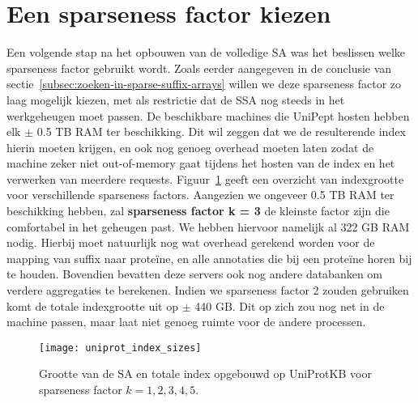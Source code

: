 \section{Een sparseness factor kiezen}
Een volgende stap na het opbouwen van de volledige SA was het beslissen welke sparseness factor gebruikt wordt.
Zoals eerder aangegeven in de conclusie van sectie~\ref{subsec:zoeken-in-sparse-suffix-arrays} willen we deze sparseness factor zo laag mogelijk kiezen, met als restrictie dat de SSA nog steeds in het werkgeheugen moet passen.
De beschikbare machines die UniPept hosten hebben elk $\pm$ 0.5 TB RAM ter beschikking.
Dit wil zeggen dat we de resulterende index hierin moeten krijgen, en ook nog genoeg overhead moeten laten zodat de machine zeker niet out-of-memory gaat tijdens het hosten van de index en het verwerken van meerdere requests.
Figuur~\ref{fig:uniprot_index_size_sparsenessfactors} geeft een overzicht van indexgrootte voor verschillende sparseness factors.
Aangezien we ongeveer 0.5 TB RAM ter beschikking hebben, zal \textbf{sparseness factor k = 3} de kleinste factor zijn die comfortabel in het geheugen past.
We hebben hiervoor namelijk al 322 GB RAM nodig.
Hierbij moet natuurlijk nog wat overhead gerekend worden voor de mapping van suffix naar proteïne, en alle annotaties die bij een proteïne horen bij te houden.
Bovendien bevatten deze servers ook nog andere databanken om verdere aggregaties te berekenen.
Indien we sparseness factor 2 zouden gebruiken komt de totale indexgrootte uit op $\pm$ 440 GB\@.
Dit op zich zou nog net in de machine passen, maar laat niet genoeg ruimte voor de andere processen.

\begin{figure}[h!]
    \centering
    \texttt{[image: uniprot\_index\_sizes]}
    \caption{Grootte van de SA en totale index opgebouwd op UniProtKB voor sparseness factor $k = 1, 2, 3, 4, 5$.}
    \label{fig:uniprot_index_size_sparsenessfactors}
\end{figure}

